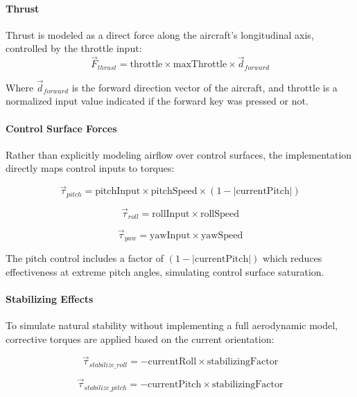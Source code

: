 \paragraph{Thrust}
Thrust is modeled as a direct force along the aircraft's longitudinal axis, controlled by the throttle input:
\begin{equation}
\vec{F}_{thrust} = \text{throttle} \times \text{maxThrottle} \times \vec{d}_{forward}
\end{equation}

Where $\vec{d}_{forward}$ is the forward direction vector of the aircraft, and throttle is a normalized input value indicated if the forward key was pressed or not.

\paragraph{Control Surface Forces}
Rather than explicitly modeling airflow over control surfaces, the implementation directly maps control inputs to torques:

\begin{equation}
\vec{\tau}_{pitch} = \text{pitchInput} \times \text{pitchSpeed} \times (1 - |\text{currentPitch}|)
\end{equation}

\begin{equation}
\vec{\tau}_{roll} = \text{rollInput} \times \text{rollSpeed}
\end{equation}

\begin{equation}
\vec{\tau}_{yaw} = \text{yawInput} \times \text{yawSpeed}
\end{equation}

The pitch control includes a factor of $(1 - |\text{currentPitch}|)$ which reduces effectiveness at extreme pitch angles, simulating control surface saturation.

\paragraph{Stabilizing Effects}
To simulate natural stability without implementing a full aerodynamic model, corrective torques are applied based on the current orientation:

\begin{equation}
\vec{\tau}_{stabilize\_roll} = -\text{currentRoll} \times \text{stabilizingFactor}
\end{equation}

\begin{equation}
\vec{\tau}_{stabilize\_pitch} = -\text{currentPitch} \times \text{stabilizingFactor}
\end{equation}

